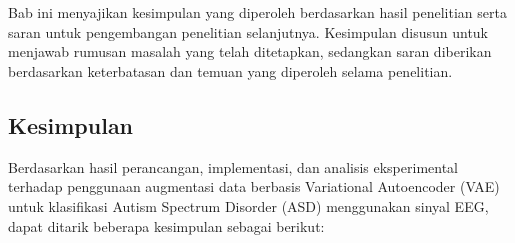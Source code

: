 \chapter{\babLima}

Bab ini menyajikan kesimpulan yang diperoleh berdasarkan hasil penelitian serta saran untuk pengembangan penelitian selanjutnya. Kesimpulan disusun untuk menjawab rumusan masalah yang telah ditetapkan, sedangkan saran diberikan berdasarkan keterbatasan dan temuan yang diperoleh selama penelitian.

\section{Kesimpulan}
Berdasarkan hasil perancangan, implementasi, dan analisis eksperimental terhadap penggunaan augmentasi data berbasis Variational Autoencoder (VAE) untuk klasifikasi Autism Spectrum Disorder (ASD) menggunakan sinyal EEG, dapat ditarik beberapa kesimpulan sebagai berikut:

